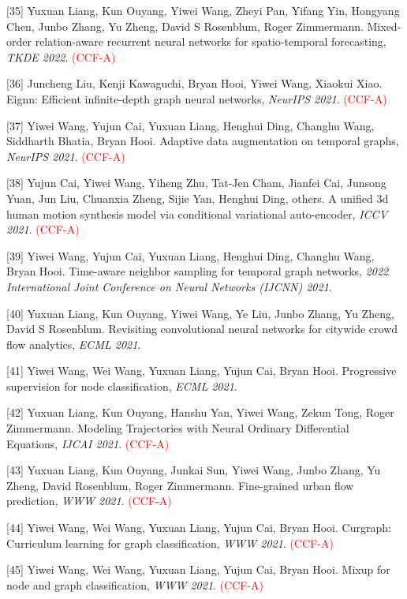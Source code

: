 [35] Yuxuan Liang, Kun Ouyang, Yiwei Wang, Zheyi Pan, Yifang Yin, Hongyang Chen, Junbo Zhang, Yu Zheng, David S Rosenblum, Roger Zimmermann. Mixed-order relation-aware recurrent neural networks for spatio-temporal forecasting, \textit{TKDE 2022}. \textcolor{red}{(CCF-A)}

[36] Juncheng Liu, Kenji Kawaguchi, Bryan Hooi, Yiwei Wang, Xiaokui Xiao. Eignn: Efficient infinite-depth graph neural networks, \textit{NeurIPS 2021}. \textcolor{red}{(CCF-A)}

[37] Yiwei Wang, Yujun Cai, Yuxuan Liang, Henghui Ding, Changhu Wang, Siddharth Bhatia, Bryan Hooi. Adaptive data augmentation on temporal graphs, \textit{NeurIPS 2021}. \textcolor{red}{(CCF-A)}

[38] Yujun Cai, Yiwei Wang, Yiheng Zhu, Tat-Jen Cham, Jianfei Cai, Junsong Yuan, Jun Liu, Chuanxia Zheng, Sijie Yan, Henghui Ding, others. A unified 3d human motion synthesis model via conditional variational auto-encoder, \textit{ICCV 2021}. \textcolor{red}{(CCF-A)}

[39] Yiwei Wang, Yujun Cai, Yuxuan Liang, Henghui Ding, Changhu Wang, Bryan Hooi. Time-aware neighbor sampling for temporal graph networks, \textit{2022 International Joint Conference on Neural Networks (IJCNN) 2021}.

[40] Yuxuan Liang, Kun Ouyang, Yiwei Wang, Ye Liu, Junbo Zhang, Yu Zheng, David S Rosenblum. Revisiting convolutional neural networks for citywide crowd flow analytics, \textit{ECML 2021}.

[41] Yiwei Wang, Wei Wang, Yuxuan Liang, Yujun Cai, Bryan Hooi. Progressive supervision for node classification, \textit{ECML 2021}.

[42] Yuxuan Liang, Kun Ouyang, Hanshu Yan, Yiwei Wang, Zekun Tong, Roger Zimmermann. Modeling Trajectories with Neural Ordinary Differential Equations, \textit{IJCAI 2021}. \textcolor{red}{(CCF-A)}

[43] Yuxuan Liang, Kun Ouyang, Junkai Sun, Yiwei Wang, Junbo Zhang, Yu Zheng, David Rosenblum, Roger Zimmermann. Fine-grained urban flow prediction, \textit{WWW 2021}. \textcolor{red}{(CCF-A)}

[44] Yiwei Wang, Wei Wang, Yuxuan Liang, Yujun Cai, Bryan Hooi. Curgraph: Curriculum learning for graph classification, \textit{WWW 2021}. \textcolor{red}{(CCF-A)}

[45] Yiwei Wang, Wei Wang, Yuxuan Liang, Yujun Cai, Bryan Hooi. Mixup for node and graph classification, \textit{WWW 2021}. \textcolor{red}{(CCF-A)}


